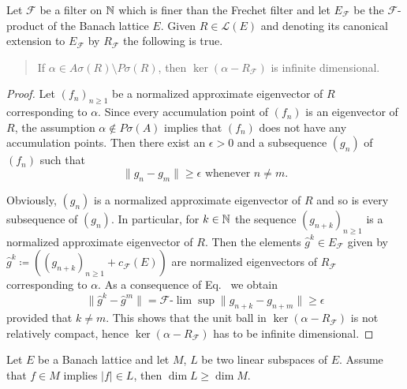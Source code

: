 \begin{lemma}\label{lem:c3-3.10}
	
	Let $\mathcal{F}$ be a filter on $\mathbb{N}$ which is finer than the Frechet filter and let $E_{\mathcal{F}}$ be the $\mathcal{F}$-product of the Banach lattice $E$.
	Given $R \in \mathcal{L}(E)$ and denoting its canonical extension to $E_{\mathcal{F}}$ by $R_{\mathcal{F}}$ the following is true.
\begin{quote}
	If\/ $\alpha \in A\sigma(R)\setminus P\sigma(R)$, then $\ker(\alpha - R_{\mathcal{F}})$ is infinite dimensional.
\end{quote}
\end{lemma}
\begin{proof}
    Let $(f_{n})_{n\geq 1}$ be a normalized approximate eigenvector of\/ $R$ corresponding to $\alpha$.
    Since every accumulation point of\/ $(f_{n})$ is an eigenvector of\/ $R$, the assumption $\alpha \notin P\sigma(A)$ implies that $(f_{n})$ does not have any accumulation points.
    Then there exist an $\epsilon > 0$ and a subsequence $(g_{n})$ of\/ $(f_{n})$ such that
    \begin{equation}\label{eq:c3-3.14}
        \|g_{n} - g_{m}\| \geq \epsilon \text{ whenever } n \neq m.
    \end{equation}
  
    Obviously, $(g_{n})$ is a normalized approximate eigenvector of\/ $R$ and so is every subsequence of\/ $(g_{n})$.
    In particular, for $k \in \mathbb{N}$ the sequence $(g_{n+k})_{n\geq 1}$ is a normalized approximate eigenvector of\/ $R$.
    Then the elements $\hat{g}^{k} \in E_{\mathcal{F}}$ given by $\hat{g}^{k} \coloneq ((g_{n+k})_{n\geq 1} + c_{\mathcal{F}}(E))$ are normalized eigenvectors of\/ $R_{\mathcal{F}}$ corresponding to $\alpha$.
    As a consequence of Eq.~ we obtain
\[
	\|\hat{g}^{k} - \hat{g}^{m}\| = \mathcal{F}\text{-}\lim\sup\|g_{n+k} - g_{n+m}\| \geq \epsilon
\]
%
provided that $k \neq m$.
    This shows that the unit ball in $\ker(\alpha - R_{\mathcal{F}})$ is not relatively compact, hence $\ker(\alpha - R_{\mathcal{F}})$ has to be infinite dimensional.
\end{proof}
\begin{lemma}\label{lem:c3-3.11}
	
	Let $E$ be a Banach lattice and let $M$, $L$ be two linear subspaces of\/ $E$.
	Assume that $f \in M$ implies $|f| \in L$, then $\dim L \geq \dim M$.
\end{lemma}
